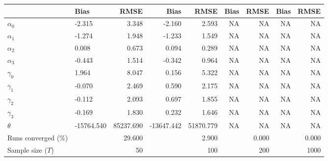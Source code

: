
\begin{tabular}[t]{llrrrrrrr}
\toprule
  & Bias & RMSE & Bias & RMSE & Bias & RMSE & Bias & RMSE\\
\midrule
$\alpha_{0}$ & -2.315 & 3.348 & -2.160 & 2.593 & NA & NA & NA & NA\\
$\alpha_{1}$ & -1.274 & 1.948 & -1.233 & 1.549 & NA & NA & NA & NA\\
$\alpha_{2}$ & 0.008 & 0.673 & 0.094 & 0.289 & NA & NA & NA & NA\\
$\alpha_{3}$ & -0.443 & 1.514 & -0.342 & 0.964 & NA & NA & NA & NA\\
$\gamma_{0}$ & 1.964 & 8.047 & 0.156 & 5.322 & NA & NA & NA & NA\\
$\gamma_{1}$ & -0.070 & 2.469 & 0.590 & 2.175 & NA & NA & NA & NA\\
$\gamma_{2}$ & -0.112 & 2.093 & 0.697 & 1.855 & NA & NA & NA & NA\\
$\gamma_{3}$ & -0.169 & 1.830 & 0.232 & 1.646 & NA & NA & NA & NA\\
$\theta$ & -15764.540 & 85237.690 & -13647.442 & 51870.779 & NA & NA & NA & NA\\
Runs converged (\%) &  & 29.600 &  & 2.900 &  & 0.000 &  & 0.000\\
Sample size ($T$) &  & 50 &  & 100 &  & 200 &  & 1000\\
\bottomrule
\end{tabular}
